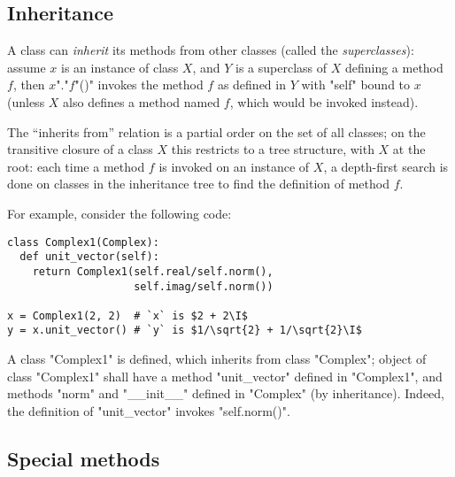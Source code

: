 {\subsection{Inheritance}
\label{sec:inheritance}

A class can \emph{inherit} its methods from other classes (called the
\emph{superclasses}): assume $x$ is an instance of class $X$, and $Y$ is a
superclass of $X$ defining a method $f$, then $x$"."$f$"()" invokes the
method $f$ as defined in $Y$ with "self" bound to $x$ (unless $X$
also defines a method named $f$, which would be invoked instead).

The ``inherits from'' relation is a partial order on the set of all
classes; on the transitive closure of a class $X$ this restricts to a
tree structure, with $X$ at the root: each time a method $f$ is
invoked on an instance of $X$, a depth-first search is done on classes
in the inheritance tree to find the definition of method $f$.

For example, consider the following code:
\begin{lstlisting}
class Complex1(Complex):
  def unit_vector(self):
    return Complex1(self.real/self.norm(), 
                    self.imag/self.norm())

x = Complex1(2, 2)  # `x` is $2 + 2\I$
y = x.unit_vector() # `y` is $1/\sqrt{2} + 1/\sqrt{2}\I$
\end{lstlisting}
A class "Complex1" is defined, which inherits from class
"Complex"; object of class "Complex1" shall have a method
"unit_vector" defined in "Complex1", and  methods "norm" and
"__init__" defined in "Complex" (by inheritance).  Indeed, the
definition of "unit_vector" invokes "self.norm()".

\subsection{Special methods}
\label{sec:special-methods}

}
